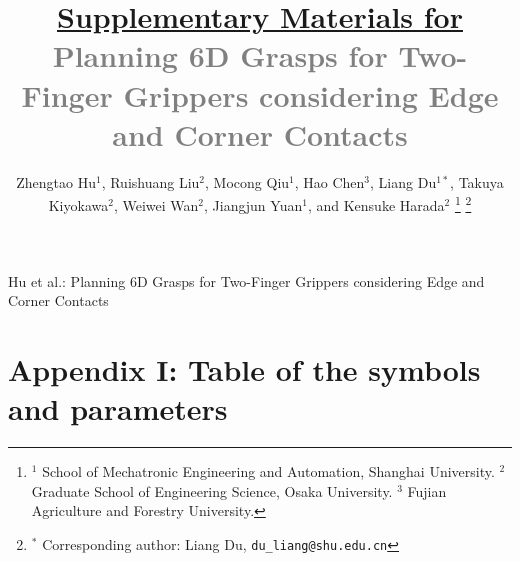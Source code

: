 \documentclass[onecolumn]{IEEEtran}
\newcommand{\subtt}[1]{\textcolor{gray}{#1}}
\begin{document}
\title{\uline{Supplementary Materials for}\\
\subtt{Planning 6D Grasps for Two-Finger Grippers considering Edge and Corner Contacts}}


\author{Zhengtao Hu$^{1}$, Ruishuang Liu$^{2}$, Mocong Qiu$^{1}$, Hao Chen$^{3}$, Liang Du$^{1*}$, Takuya Kiyokawa$^{2}$, Weiwei Wan$^{2}$, Jiangjun Yuan$^{1}$, and Kensuke Harada$^{2}$
\thanks{$^{1}$ School of Mechatronic Engineering and Automation, Shanghai University. $^{2}$ Graduate School of Engineering Science, Osaka University. $^{3}$ Fujian Agriculture and Forestry University.}
\thanks{$^{*}$ Corresponding author: Liang Du, {\tt\small du\_liang@shu.edu.cn}}%
}
{Hu \MakeLowercase{et al.}: Planning 6D Grasps for Two-Finger Grippers considering Edge and Corner Contacts} 



\maketitle
\section{Appendix I: Table of the symbols and parameters}
\end{document}
